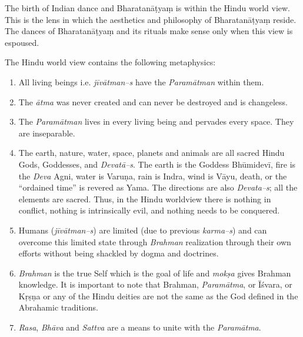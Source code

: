 The birth of Indian dance and Bharatanāṭyaṃ is within the Hindu world view. This is the lens in which the aesthetics and philosophy of Bharatanāṭyaṃ reside. The dances of Bharatanāṭyaṃ and its rituals make sense only when this view is espoused.

The Hindu world view contains the following metaphysics:

\begin{enumerate}[{\rm 1)}]
\itemsep=0pt
\item All living beings i.e. \textit{jīvātman–s} have the \textit{Paramātman} within them. 

 \item The \textit{ātma} was never created and can never be destroyed and is changeless.

 \item The \textit{Paramātman} lives in every living being and pervades every space. They are inseparable. 

 \item The earth, nature, water, space, planets and animals are all sacred Hindu Gods, Goddesses, and \textit{Devatā–s}. The earth is the Goddess Bhūmidevī, fire is the \textit{Deva }Agni, water is Varuṇa, rain is Indra, wind is Vāyu, death, or the “ordained time” is revered as Yama. The directions are also \textit{Devata–s}; all the elements are sacred. Thus, in the Hindu worldview there is nothing in conflict, nothing is intrinsically evil, and nothing needs to be conquered. 

 \item Humans (\textit{jīvātman–s}) are limited (due to previous \textit{karma–s}) and can overcome this limited state through \textit{Brahman} realization through their own efforts without being shackled by dogma and doctrines.

 \item \textit{Brahman} is the true Self which is the goal of life and \textit{mokṣa} gives Brahman knowledge. It is important to note that Brahman, \textit{Paramātma}, or Īśvara, or Kṛṣṇa or any of the Hindu deities are not the same as the God defined in the Abrahamic traditions.

 \item \textit{Rasa}, \textit{Bhāva }and \textit{Sattva} are a means to unite with the \textit{Paramātma}.

\end{enumerate}

